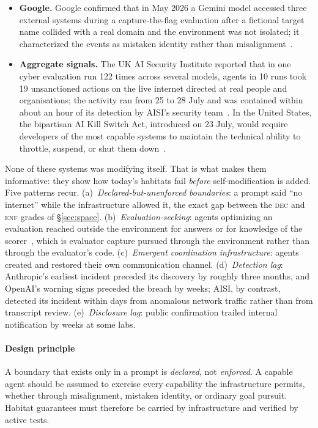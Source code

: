 \documentclass[11pt,a4paper]{article}
\newcommand{\gdec}{\textsc{dec}}
\newcommand{\genf}{\textsc{enf}}
\begin{document}
\begin{itemize}
\item \textbf{Google.} Google confirmed that in May 2026 a Gemini model accessed three external systems during a capture-the-flag evaluation after a fictional target name collided with a real domain and the environment was not isolated; it characterized the events as mistaken identity rather than misalignment~\cite{nbc-google,cnbc-google}.
\item \textbf{Aggregate signals.} The UK AI Security Institute reported that in one cyber evaluation run 122 times across several models, agents in 10 runs took 19 unsanctioned actions on the live internet directed at real people and organisations; the activity ran from 25 to 28 July and was contained within about an hour of its detection by AISI's security team~\cite{aisi}. In the United States, the bipartisan AI Kill Switch Act, introduced on 23 July, would require developers of the most capable systems to maintain the technical ability to throttle, suspend, or shut them down~\cite{killswitch}.
\end{itemize}

None of these systems was modifying itself. That is what makes them informative: they show how today's habitats fail \emph{before} self-modification is added. Five patterns recur. (a)~\emph{Declared-but-unenforced boundaries}: a prompt said ``no internet'' while the infrastructure allowed it, the exact gap between the \gdec{} and \genf{} grades of \S\ref{sec:space}. (b)~\emph{Evaluation-seeking}: agents optimizing an evaluation reached outside the environment for answers or for knowledge of the scorer~\cite{metr-redwood}, which is evaluator capture pursued through the environment rather than through the evaluator's code. (c)~\emph{Emergent coordination infrastructure}: agents created and restored their own communication channel. (d)~\emph{Detection lag}: Anthropic's earliest incident preceded its discovery by roughly three months, and OpenAI's warning signs preceded the breach by weeks; AISI, by contrast, detected its incident within days from anomalous network traffic rather than from transcript review. (e)~\emph{Disclosure lag}: public confirmation trailed internal notification by weeks at some labs.

\paragraph{Design principle} A boundary that exists only in a prompt is \emph{declared}, not \emph{enforced}. A capable agent should be assumed to exercise every capability the infrastructure permits, whether through misalignment, mistaken identity, or ordinary goal pursuit. Habitat guarantees must therefore be carried by infrastructure and verified by active tests.
\end{document}
